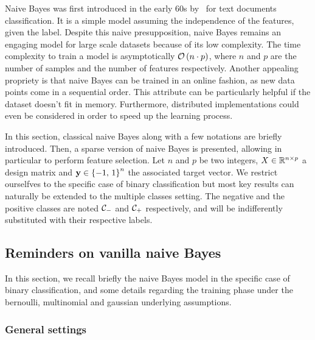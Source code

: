 Naive Bayes was first introduced in the early 60s by~\cite{original_naive_bayes} for text documents classification.
It is a simple model assuming the independence of the features, given the label.
Despite this naive presupposition,
naive Bayes remains an engaging model for large scale datasets because of its low complexity.
The time complexity to train a model is asymptotically $\mathcal{O}\left( n \cdot p \right)$,
where $n$ and $p$ are the number of samples and the number of features respectively.
Another appealing propriety is that naive Bayes can be trained in an online fashion,
as new data points come in a sequential order.
This attribute can be particularly helpful if the dataset doesn't fit in memory.
Furthermore, distributed implementations could even be considered in order to speed up the learning process.

In this section, classical naive Bayes along with a few notations are briefly introduced.
Then, a sparse version of naive Bayes is presented,
allowing in particular to perform feature selection.
Let $n$ and $p$ be two integers, $X \in \mathbb{R}^{n \times p}$ a design matrix
and $\mathbf{y} \in \left\{ -1,\, 1 \right\}^n$ the associated target vector.
We restrict ourselfves to the specific case of binary classification
but most key results can naturally be extended to the multiple classes setting.
The negative and the positive classes are noted $\mathcal{C}_-$ and $\mathcal{C}_+$ respectively,
and will be indifferently substituted with their respective labels.

\subsection{Reminders on vanilla naive Bayes}\label{subsec:naive_bayes}

In this section, we recall briefly the naive Bayes model in the specific case of binary classification,
and some details regarding the training phase under the bernoulli, multinomial and gaussian underlying assumptions.

\subsubsection{General settings}\label{subsubsec:nb_general}

